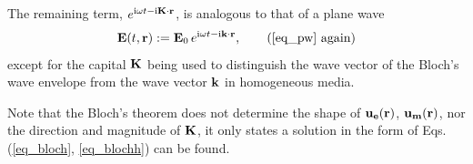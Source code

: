 The remaining term, $e^{{\mathrm i}\omega t - {\mathrm i}{\mathbf{K}}\cdot{\mathbf{r}}}$, is analogous to that of a plane wave
\begin{equation} \E(t, \rr) := \E_0\, e^{\ii\omega t - \ii\kk\cdot\rr}, \tag{\ref{eq_pw} \again} \end{equation}
except for the capital ${\mathbf{K}}$ being used to distinguish the wave vector of the Bloch's wave envelope from the wave vector ${\mathbf{k}}$ in homogeneous media. 

Note that the Bloch's theorem does not determine the shape of $\mathbf{u_e}({\mathbf{r}})$, $\mathbf{u_m}({\mathbf{r}})$, nor the direction and magnitude of ${\mathbf{K}}$, it only states a solution in the form of Eqs. (\ref{eq_bloch}, \ref{eq_blochh}) can be found.

